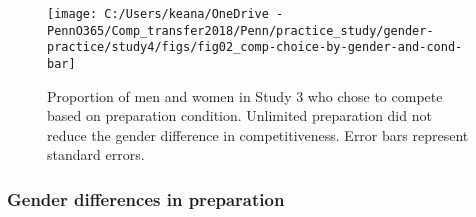 \documentclass[letterpaper, nobind]{templates/ociamthesis}
\begin{document}
\begin{figure}

{\centering \texttt{[image: C:/Users/keana/OneDrive - PennO365/Comp\_transfer2018/Penn/practice\_study/gender-practice/study4/figs/fig02\_comp-choice-by-gender-and-cond-bar]} 

}

\caption{Proportion of men and women in Study 3 who chose to compete based on preparation condition. Unlimited preparation did not reduce the gender difference in competitiveness. Error bars represent standard errors.}\label{fig:s300}
\end{figure}

\newpage

\hypertarget{gender-differences-in-preparation-3}{%
\subsubsection{Gender differences in preparation}\label{gender-differences-in-preparation-3}}
\end{document}
